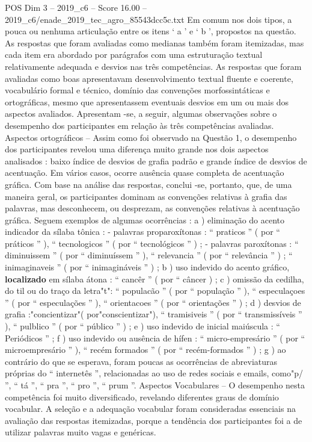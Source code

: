 \begin{textsample}{POS Dim 3 – 2019\_c6 – Score 16.00 – 2019\_c6/enade\_2019\_tec\_agro\_85543dcc5c.txt}
Em comum nos dois tipos, a pouca ou nenhuma articulação entre os itens ‘ a ’ e ‘ b ’, propostos na questão.
As respostas que foram avaliadas como medianas também foram itemizadas, mas cada item era abordado por parágrafos com uma estruturação textual relativamente adequada e desvios nas três competências.
As respostas que foram avaliadas como boas apresentavam desenvolvimento textual fluente e coerente, vocabulário formal e técnico, domínio das convenções morfossintáticas e ortográficas, mesmo que apresentassem eventuais desvios em um ou mais dos aspectos avaliados.
Apresentam -se, a seguir, algumas observações sobre o desempenho dos participantes em relação às três competências avaliadas.
Aspectos ortográficos – Assim como foi observado na Questão 1, o desempenho dos participantes revelou uma diferença muito grande nos dois aspectos analisados : baixo índice de desvios de grafia padrão e grande índice de desvios de acentuação.
Em vários casos, ocorre ausência quase completa de acentuação gráfica.
Com base na análise das respostas, conclui -se, portanto, que, de uma maneira geral, os participantes dominam as convenções relativas à grafia das palavras, mas desconhecem, ou desprezam, as convenções relativas à acentuação gráfica.
Seguem exemplos de algumas ocorrências : a ) eliminação do acento indicador da sílaba tônica : - palavras proparoxítonas : “ praticos ” ( por “ práticos ” ), “ tecnologicos ” ( por “ tecnológicos ” ) ; - palavras paroxítonas : “ diminuissem ” ( por “ diminuíssem ” ), “ relevancia ” ( por “ relevância ” ) ; “ inimaginaveis ” ( por “ inimagináveis ” ) ; b ) uso indevido do acento gráfico, \textbf{localizado} em sílaba átona : “ cancêr ” ( por “ câncer ) ; c ) omissão da cedilha, do til ou do traço da letra"t": “ populacão ” ( por “ população ” ), “ especulaçoes ” ( por “ especulações ” ), “ orientacoes ” ( por “ orientações ” ) ; d ) desvios de grafia :"concientizar"( por"conscientizar"), “ tramisiveis ” ( por “ transmissíveis ” ), “ pulblico ” ( por “ público ” ) ; e ) uso indevido de inicial maiúscula : “ Periódicos ” ; f ) uso indevido ou ausência de hífen : “ micro-empresário ” ( por “ microempresário ” ), “ recém formados ” ( por “ recém-formados ” ) ; g ) ao contrário do que se esperava, foram poucas as ocorrências de abreviaturas próprias do “ internetês ”, relacionadas ao uso de redes sociais e emails, como"p/ ”, “ tá ”, “ pra ”, “ pro ”, “ prum ”.
Aspectos Vocabulares – O desempenho nesta competência foi muito diversificado, revelando diferentes graus de domínio vocabular.
A seleção e a adequação vocabular foram consideradas essenciais na avaliação das respostas itemizadas, porque a tendência dos participantes foi a de utilizar palavras muito vagas e genéricas.

\end{textsample}
